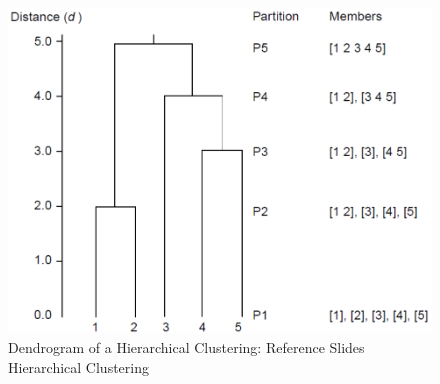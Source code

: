 \documentclass[a4paper,10pt]{article}
\theoremstyle{plain}
\theoremstyle{definition}
\begin{document}
\begin{figure}[H]
	\centering
	\includegraphics*[scale=0.3]{./pictures/hc/hc_example.png}
	\caption{Dendrogram of a Hierarchical Clustering: Reference Slides Hierarchical Clustering}
	\label{fig:hc example}
\end{figure}
\end{document}
